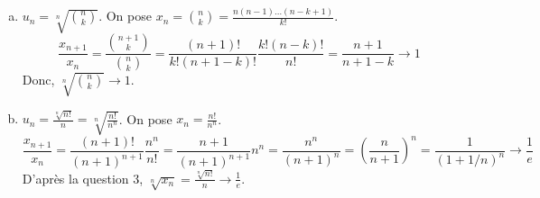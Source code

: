 \documentclass[]{exercices}
\begin{document}
\begin{solution}
\begin{enumerate}
\begin{enumerate}[a)]
			      \item $u_n=\sqrt[n]{\binom{n}{k}}$. On pose $x_n = \binom{n}{k} = \frac{n(n-1)\dots(n-k+1)}{k!}$.
			            \[ \frac{x_{n+1}}{x_n} = \frac{\binom{n+1}{k}}{\binom{n}{k}} = \frac{(n+1)!}{k!(n+1-k)!} \frac{k!(n-k)!}{n!} = \frac{n+1}{n+1-k} \to 1 \]
			            Donc, $\sqrt[n]{\binom{n}{k}} \to 1$.
			      \item $u_n=\frac{\sqrt[n]{n!}}{n} = \sqrt[n]{\frac{n!}{n^n}}$. On pose $x_n = \frac{n!}{n^n}$.
			            \[ \frac{x_{n+1}}{x_n} = \frac{(n+1)!}{(n+1)^{n+1}} \frac{n^n}{n!} = \frac{n+1}{(n+1)^{n+1}} n^n = \frac{n^n}{(n+1)^n} = \left(\frac{n}{n+1}\right)^n = \frac{1}{(1+1/n)^n} \to \frac{1}{e} \]
			            D'après la question 3, $\sqrt[n]{x_n} = \frac{\sqrt[n]{n!}}{n} \to \frac{1}{e}$.
		      \end{enumerate}
	\end{enumerate}
\end{solution}
\end{document}
